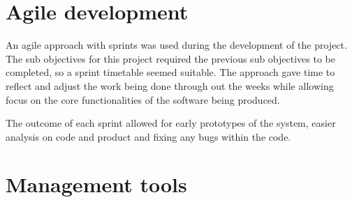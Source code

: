 \documentclass[12pt]{report}
\begin{document}
\section{Agile development}

An agile approach with sprints was used during the development of the project. The sub objectives for this project required the previous sub objectives to be completed, so a sprint timetable seemed suitable. The approach gave time to reflect and adjust the work being done through out the weeks while allowing focus on the core functionalities of the software being produced. 

The outcome of each sprint allowed for early prototypes of the system, easier analysis on code and product and fixing any bugs within the code.

\section{Management tools}
\end{document}

